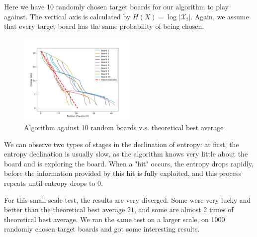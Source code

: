 Here we have 10 randomly chosen target boards for our algorithm to play against. The vertical axis is calculated by $H(X) = \log |\mathcal{X}_t|$. Again, we assume that every target board has the same probability of being chosen.
\begin{figure}[H]
    \centering
    \includegraphics[width=0.5\textwidth]{figure/battleship_10_1.pdf}
    \caption{Algorithm against 10 random boards v.s. theoretical best average}
    \label{fig:Battleship10}
\end{figure}



We can observe two types of stages in the declination of entropy: at first, the entropy declination is usually slow, as the algorithm knows very little about the board and is exploring the board. When a "hit" occurs, the entropy drops rapidly, before the information provided by this hit is fully exploited, and this process repeats until entropy drops to 0. 



For this small scale test, the results are very diverged. Some were very lucky and better than the theoretical best average $21$, and some are almost 2 times of theoretical best average. We ran the same test on a larger scale, on 1000 randomly chosen target boards and got some interesting results.

